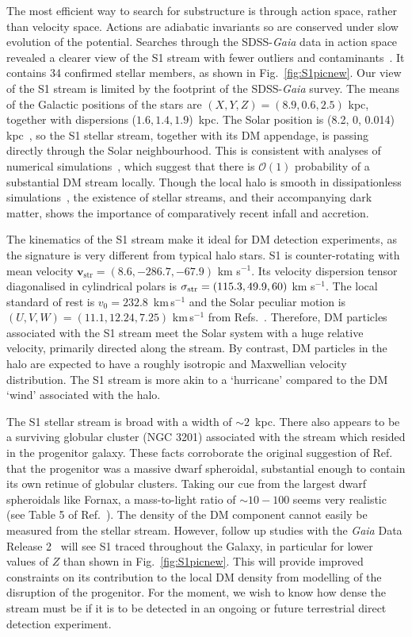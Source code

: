 \documentclass[prd,10pt,twocolumn,showpacs,nofootinbib,aps,superscriptaddress,preprintnumbers]{revtex4-1}
\newcommand{\vstr}{\mathbf{v}_\mathrm{str}}
\begin{document}
The most efficient way to search for substructure is through action
space, rather than velocity space. Actions are adiabatic invariants so
are conserved under slow evolution of the potential. Searches through
the SDSS-{\it Gaia} data in action space revealed a clearer view of
the S1 stream with fewer outliers and
contaminants~\citep{Myeong:Preprint}.  It contains 34 confirmed
stellar members, as shown in Fig.~\ref{fig:S1picnew}. Our view of the
S1 stream is limited by the footprint of the SDSS-{\it Gaia}
survey. The means of the Galactic positions of the stars are $(X,Y,Z)
= (8.9,0.6,2.5)$ kpc, together with dispersions ($1.6, 1.4, 1.9$)~kpc.
The Solar position is (8.2, 0, 0.014) kpc~\cite{Binney:1997,
  McMillan:2017}, so the S1 stellar stream, together with its DM
appendage, is passing directly through the Solar neighbourhood. This
is consistent with analyses of numerical
simulations~\citep{Stiff:2001}, which suggest that there is
$\mathcal{O}(1)$ probability of a substantial DM stream
locally. Though the local halo is smooth in dissipationless
simulations~\citep{Vogelsberger:2008qb}, the existence of stellar
streams, and their accompanying dark matter, shows the importance of
comparatively recent infall and accretion.

The kinematics of the S1 stream make it ideal for DM detection
experiments, as the signature is very different from typical halo
stars.  S1 is counter-rotating with mean velocity $\vstr = (8.6,
-286.7, -67.9)$ km s$^{-1}$. Its velocity dispersion tensor
diagonalised in cylindrical polars is $\sigma_{\rm str} = (115.3,
49.9, 60)$ km s$^{-1}$. The local standard of rest is $v_0 = 232.8$~km\,s$^{-1}$ and the Solar peculiar motion is $(U,V,W) = (11.1, 12.24,
7.25)$ km\,s$^{-1}$ from
Refs.~\cite{Schonrich:2010,McMillan:2017}. Therefore, DM particles
associated with the S1 stream meet the Solar system with a huge
relative velocity, primarily directed along the stream. By contrast,
DM particles in the halo are expected to have a roughly isotropic and
Maxwellian velocity distribution. The S1 stream is more akin to a 
`hurricane' compared to the DM `wind' associated with the halo.

The S1 stellar stream is broad with a width of $\sim 2$~kpc. There
also appears to be a surviving globular cluster (NGC 3201) associated with the
stream which resided in the progenitor galaxy. These facts
corroborate the original suggestion of Ref.~\citep{Myeong:2018} that
the progenitor was a massive dwarf spheroidal, substantial enough to
contain its own retinue of globular clusters. Taking our cue from the
largest dwarf spheroidals like Fornax, a mass-to-light ratio of $\sim
10-100$ seems very realistic (see Table 5 of
Ref.~\cite{Amorisco:2011}). The density of the DM component cannot
easily be measured from the stellar stream. However, follow up studies with the \emph{Gaia} Data
Release 2~\cite{GaiaDR2} will see S1 traced throughout the Galaxy, in particular for lower values of $Z$ than shown 
in Fig.~\ref{fig:S1picnew}. This will provide improved constraints on
its contribution to the local DM density from modelling of
the disruption of the progenitor. For the moment, we wish to know how
dense the stream must be if it is to be detected in an ongoing or
future terrestrial direct detection experiment.
\end{document}
